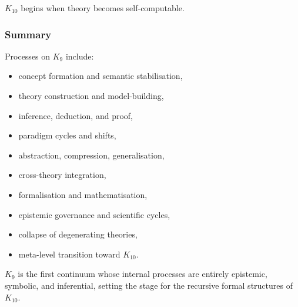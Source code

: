$K_{10}$ begins when theory becomes self-computable.

\subsubsection{Summary}

Processes on $K_9$ include:
\begin{itemize}
    \item concept formation and semantic stabilisation,
    \item theory construction and model-building,
    \item inference, deduction, and proof,
    \item paradigm cycles and shifts,
    \item abstraction, compression, generalisation,
    \item cross-theory integration,
    \item formalisation and mathematisation,
    \item epistemic governance and scientific cycles,
    \item collapse of degenerating theories,
    \item meta-level transition toward $K_{10}$.
\end{itemize}

$K_9$ is the first continuum whose internal processes are entirely
epistemic, symbolic, and inferential, setting the stage for the
recursive formal structures of $K_{10}$.
